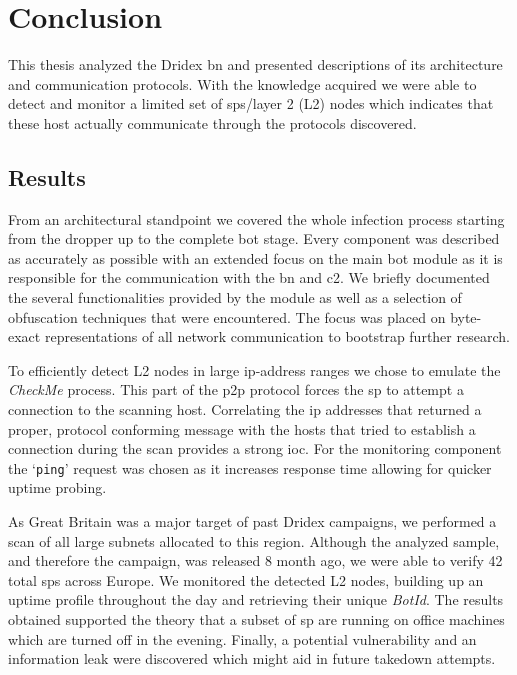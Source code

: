 \chapter{Conclusion\label{ch:Conclusion}}

This thesis analyzed the Dridex \gls{bn} and presented descriptions of its architecture and communication protocols.
With the knowledge acquired we were able to detect and monitor a limited set of \glspl{sp}/layer 2 (L2) nodes which indicates that these host actually communicate through the protocols discovered.


\section{Results}\label{sec:Conclusion::Results}
From an architectural standpoint we covered the whole infection process starting from the dropper up to the complete \gls{bot} stage.
Every component was described as accurately as possible with an extended focus on the main bot module as it is responsible for the communication with the \gls{bn} and \gls{c2}.
We briefly documented the several functionalities provided by the module as well as a selection of obfuscation techniques that were encountered.
The focus was placed on byte-exact representations of all network communication to bootstrap further research.

To efficiently detect L2 nodes in large \gls{ip}-address ranges we chose to emulate the \emph{CheckMe} process.
This part of the \gls{p2p} protocol forces the \gls{sp} to attempt a connection to the scanning host.
Correlating the \gls{ip} addresses that returned a proper, protocol conforming message with the hosts that tried to establish a connection during the scan provides a strong \gls{ioc}.
For the monitoring component the `\lstinline|ping|' request was chosen as it increases response time allowing for quicker uptime probing.

As Great Britain was a major target of past Dridex campaigns, we performed a scan of all large subnets allocated to this region.
Although the analyzed sample, and therefore the campaign, was released 8 month ago, we were able to verify 42 total \glspl{sp} across Europe.
We monitored the detected L2 nodes, building up an uptime profile throughout the day and retrieving their unique \emph{BotId}.
The results obtained supported the theory that a subset of \gls{sp} are running on office machines which are turned off in the evening.
Finally, a potential vulnerability and an information leak were discovered which might aid in future takedown attempts.


